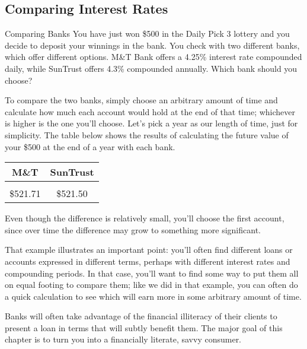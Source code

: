 \subsection{Comparing Interest Rates}
\begin{example}{Comparing Banks}
You have just won \$500 in the Daily Pick 3 lottery and you decide to deposit your winnings in the bank.  You check with two different banks, which offer different options.  M\&T Bank offers a 4.25\% interest rate compounded daily, while SunTrust offers 4.3\% compounded annually.  Which bank should you choose?

\solline
To compare the two banks, simply choose an arbitrary amount of time and calculate how much each account would hold at the end of that time; whichever is higher is the one you'll choose.  Let's pick a year as our length of time, just for simplicity.  The table below shows the results of calculating the future value of your \$500 at the end of a year with each bank.
\begin{center}
\begin{tabular}{c c}
M\&T & SunTrust\\
\hline
& \\
\$521.71 & \$521.50
\end{tabular}
\end{center}
Even though the difference is relatively small, you'll choose the first account, since over time the difference may grow to something more significant.
\end{example}
\vfill

That example illustrates an important point: you'll often find different loans or accounts expressed in different terms, perhaps with different interest rates and compounding periods.  In that case, you'll want to find some way to put them all on equal footing to compare them; like we did in that example, you can often do a quick calculation to see which will earn more in some arbitrary amount of time.

Banks will often take advantage of the financial illiteracy of their clients to present a loan in terms that will subtly benefit them.  The major goal of this chapter is to turn you into a financially literate, savvy consumer.
\vfill

